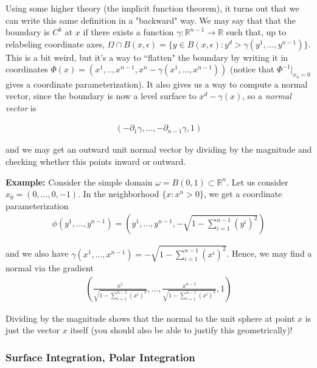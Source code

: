 \documentclass{article}
\newcommand{\R}{{\mathbb{R}}}
\newcommand{\pd}{\partial}
\begin{document}
	Using some higher theory (the implicit function theorem), it turns out that we can write this same definition in a "backward" way. We may say that that the boundary is $C^{k}$ at $x$ if there exists a function $\gamma: \R^{n-1} \to \R$ such that, up to relabeling coordinate axes, $\Omega \cap B(x,\epsilon) = \{y \in B(x,\epsilon) : y^{d} > \gamma(y^{1},...,y^{n-1})\}$. This is a bit weird, but it's a way to ``flatten" the boundary by writing it in coordinates $\Phi(x) = (x^{1},..,x^{n-1},x^{n}-\gamma(x^{1},...,x^{n-1}))$ (notice that $\Phi^{-1}|_{x_{n} = 0}$ gives a coordinate parameterization). It also gives us a way to compute a normal vector, since the boundary is now a level surface to $x^{d} - \gamma(x)$, so a \textit{normal vector} is 
	
	\begin{align*}
		(-\pd_{1} \gamma,...,-\pd_{n-1}\gamma,1)
	\end{align*}
	
	and we may get an outward unit normal vector by dividing by the magnitude and checking whether this points inward or outward.
	
	\vspace{0.25cm}
	
	\textbf{Example:} 
	Consider the simple domain $\omega = B(0,1) \subset \R^{n}$. Let us consider $x_0 = (0,...,0,-1)$. In the neighborhood $\{x : x^{n} > 0 \}$, we get a coordinate parameterization  
	\begin{align*}
		\phi(y^1,...,y^{n-1}) = (y^{1},...,y^{n-1},-\sqrt{1-\sum_{i=1}^{n-1} (y^i)^{2}}) 
	\end{align*}
	
	and we also have $\gamma(x^1,...,x^{n-1}) = -\sqrt{1 - \sum_{i=1}^{n-1}(x^i)^{2} }$. Hence, we may find a normal via the gradient
	\begin{align*}
		(\frac{x^1}{\sqrt{1 - \sum_{i=1}^{n-1}(x^i)^{2} }},...,\frac{x^{n-1}}{\sqrt{1 - \sum_{i=1}^{n-1}(x^i)^{2} }},1)
	\end{align*}
	
	Dividing by the magnitude shows that the normal to the unit sphere at point $x$ is just the vector $x$ itself (you should also be able to justify this geometrically)!
	
	
	\vspace{0.25cm}
	
	\subsubsection{Surface Integration, Polar Integration}
	
\end{document}
